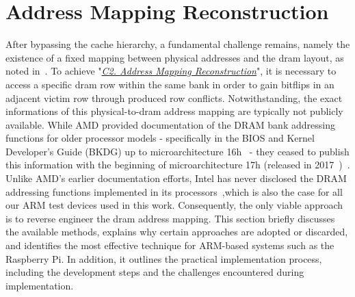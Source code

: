 \section{Address Mapping Reconstruction} \label{sec:targeted}
    After bypassing the cache hierarchy, a fundamental challenge remains, namely the existence of a 
    fixed mapping between physical addresses and the \gls{dram} layout, as noted in~\cite{toolRPI3}. 
    To achieve "\textit{\hyperref[ch:targeted]{C2. Address Mapping Reconstruction}}", it is necessary to access a specific 
    \gls{dram} row within the same bank in order to gain bitflips in an adjacent victim row through produced row conflicts. 
    Notwithstanding, the exact informations of this physical-to-\gls{dram} address mapping are typically not publicly available.
    While AMD provided documentation of the DRAM bank addressing functions for older processor models - specifically in 
    the BIOS and Kernel Developer's Guide (BKDG) up to microarchitecture 16h~\cite{webAMDDeveloperCentral} - they ceased 
    to publish this information with the beginning of microarchitecture 17h (released in 2017~\cite{webZenCPU})~\cite{paperREBankAddressing}.
    Unlike AMD's earlier documentation efforts, Intel has never disclosed the DRAM addressing functions implemented in its 
    processors~\cite{paperREBankAddressing},which is also the case for all our ARM test devices used in this work.
    Consequently, the only viable approach is to 
    reverse engineer the \gls{dram} address mapping. This section briefly discusses the available methods, 
    explains why certain approaches are adopted or discarded, and identifies the most 
    effective technique for ARM-based systems such as the Raspberry Pi. In addition, it outlines the 
    practical implementation process, including the development steps and the challenges 
    encountered during implementation.

